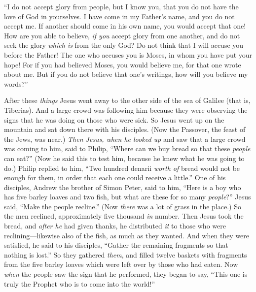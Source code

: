 \begin{biblechapter}
\verse “I do not accept glory from people,
\verse but I know you, that you do not have the love of God in yourselves.
\verse I have come in my Father’s name, and you do not accept me. If another should come in his own name, you would accept that one!
\verse How are you able to believe, \textit{if you} accept glory from one another, and do not seek the glory \textit{which is} from the only God?
\verse Do not think that I will accuse you before the Father! The one who accuses you is Moses, in whom you have put your hope!
\verse For if you had believed Moses, you would believe me, for that one wrote about me.
\verse But if you do not believe that one’s writings, how will you believe my words?”
\end{biblechapter}

\begin{biblechapter} %
 After these \textit{things} Jesus went away to the other side of the sea of Galilee (that is, Tiberias).
\verse And a large crowd was following him because they were observing the signs that he was doing on those who were sick.
\verse So Jesus went up on the mountain and sat down there with his disciples.
\verse (Now the Passover, the feast of the Jews, was near.)
\verse \textit{Then Jesus, when he looked up}  and saw that a large crowd was coming to him, said to Philip, “Where can we buy bread so that these \textit{people} can eat?”
\verse (Now he said this to test him, because he knew what he was going to do.)
\verse Philip replied to him, “Two hundred denarii \textit{worth of} bread would not be enough for them, in order that each one could receive a little.”
\verse One of his disciples, Andrew the brother of Simon Peter, said to him,
\verse “Here is a boy who has five barley loaves and two fish, but what are these for so many \textit{people}?”
\verse Jesus said, “Make the people recline.” (Now \textit{there} was a lot of grass in the place.) So the men reclined, approximately five thousand \textit{in} number.
\verse Then Jesus took the bread, and \textit{after he} had given thanks, he distributed \textit{it} to those who were reclining—likewise also of the fish, as much as they wanted.
\verse And when they were satisfied, he said to his disciples, “Gather the remaining fragments so that nothing is lost.”
\verse So they gathered \textit{them}, and filled twelve baskets with fragments from the five barley loaves which were left over by those who had eaten.
\verse Now \textit{when} the people saw the sign that he performed, they began to say, “This one is truly the Prophet who is to come into the world!”

\end{biblechapter}

